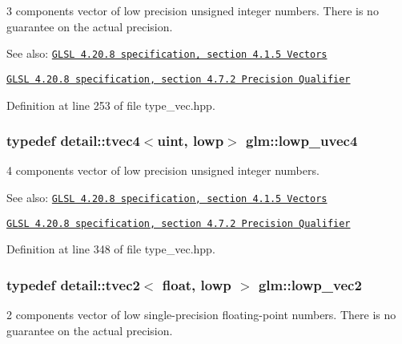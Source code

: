3 components vector of low precision unsigned integer numbers. There is no guarantee on the actual precision.

\begin{Desc}
\item[See also:]\href{http://www.opengl.org/registry/doc/GLSLangSpec.4.20.8.pdf}{\tt GLSL 4.20.8 specification, section 4.1.5 Vectors} 

\href{http://www.opengl.org/registry/doc/GLSLangSpec.4.20.8.pdf}{\tt GLSL 4.20.8 specification, section 4.7.2 Precision Qualifier} \end{Desc}


Definition at line 253 of file type\_\-vec.hpp.\hypertarget{group__core__precision_g17b5f652e5c64b0034065420d844fca7}{
\subsubsection[lowp\_\-uvec4]{\setlength{\rightskip}{0pt plus 5cm}typedef detail::tvec4$<$uint, lowp$>$ {\bf glm::lowp\_\-uvec4}}}
\label{group__core__precision_g17b5f652e5c64b0034065420d844fca7}


4 components vector of low precision unsigned integer numbers.

\begin{Desc}
\item[See also:]\href{http://www.opengl.org/registry/doc/GLSLangSpec.4.20.8.pdf}{\tt GLSL 4.20.8 specification, section 4.1.5 Vectors} 

\href{http://www.opengl.org/registry/doc/GLSLangSpec.4.20.8.pdf}{\tt GLSL 4.20.8 specification, section 4.7.2 Precision Qualifier} \end{Desc}


Definition at line 348 of file type\_\-vec.hpp.\hypertarget{group__core__precision_gc63d79532b7e8d18f579ebe63e4fde49}{
\subsubsection[lowp\_\-vec2]{\setlength{\rightskip}{0pt plus 5cm}typedef detail::tvec2$<$ float, lowp $>$ {\bf glm::lowp\_\-vec2}}}
\label{group__core__precision_gc63d79532b7e8d18f579ebe63e4fde49}


2 components vector of low single-precision floating-point numbers. There is no guarantee on the actual precision.

